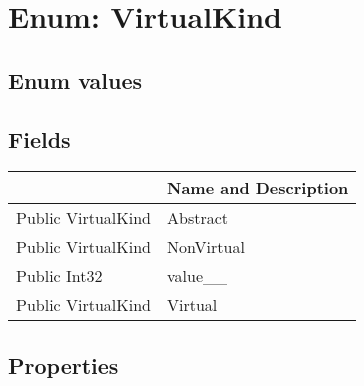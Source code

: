 \documentclass[11pt, oneside, a4paper]{book}
\begin{document}
\section{Enum: VirtualKind}

\subsection{Enum values}

\subsection{Fields}
\begin{center}
\begin{tabular}{| p{3cm} | p{12cm} | }
\hline
\textbf{ } & \textbf{ Name and Description}\\
\hline
 Public  VirtualKind &  Abstract\hypertarget{SoftwareEngineeringTools.{}Documentation.{}VirtualKind.{}Abstract}{}\\
\hline
 Public  VirtualKind &  NonVirtual\hypertarget{SoftwareEngineeringTools.{}Documentation.{}VirtualKind.{}NonVirtual}{}\\
\hline
 Public  Int32 &  value\_\_\hypertarget{SoftwareEngineeringTools.{}Documentation.{}VirtualKind.{}value\_\_}{}\\
\hline
 Public  VirtualKind &  Virtual\hypertarget{SoftwareEngineeringTools.{}Documentation.{}VirtualKind.{}Virtual}{}\\
\hline
\end{tabular}
\end{center}

\subsection{Properties}
\end{document}
